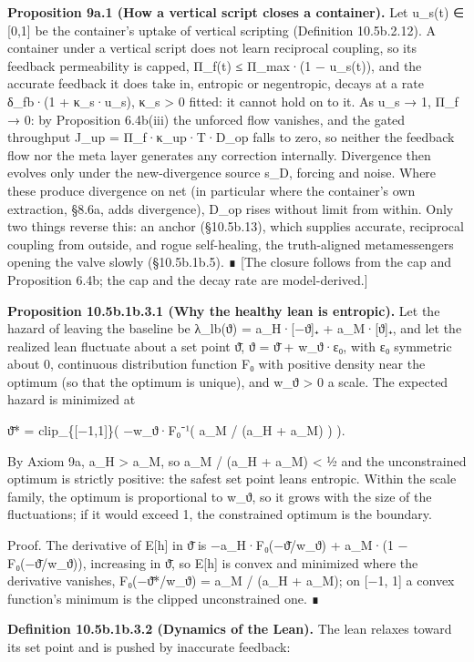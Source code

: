 \documentclass[
]{article}
\begin{document}
\textbf{Proposition 9a.1 (How a vertical script closes a container).}
Let u\_s(t) ∈ {[}0,1{]} be the container's uptake of vertical scripting
(Definition 10.5b.2.12). A container under a vertical script does not
learn reciprocal coupling, so its feedback permeability is capped,
Π\_f(t) ≤ Π\_max·(1 − u\_s(t)), and the accurate feedback it does take
in, entropic or negentropic, decays at a rate δ\_fb·(1 + κ\_s·u\_s),
κ\_s \textgreater{} 0 fitted: it cannot hold on to it. As u\_s → 1, Π\_f
→ 0: by Proposition 6.4b(iii) the unforced flow vanishes, and the gated
throughput J\_up = Π\_f·κ\_up·T·D\_op falls to zero, so neither the
feedback flow nor the meta layer generates any correction internally.
Divergence then evolves only under the new-divergence source s\_D,
forcing and noise. Where these produce divergence on net (in particular
where the container's own extraction, §8.6a, adds divergence), D\_op
rises without limit from within. Only two things reverse this: an anchor
(§10.5b.13), which supplies accurate, reciprocal coupling from outside,
and rogue self-healing, the truth-aligned metamessengers opening the
valve slowly (§10.5b.1b.5). ∎ {[}The closure follows from the cap and
Proposition 6.4b; the cap and the decay rate are model-derived.{]}

\textbf{Proposition 10.5b.1b.3.1 (Why the healthy lean is entropic).}
Let the hazard of leaving the baseline be λ\_lb(ϑ) = a\_H·{[}−ϑ{]}₊ +
a\_M·{[}ϑ{]}₊, and let the realized lean fluctuate about a set point ϑ̄,
ϑ = ϑ̄ + w\_ϑ·ε₀, with ε₀ symmetric about 0, continuous distribution
function F₀ with positive density near the optimum (so that the optimum
is unique), and w\_ϑ \textgreater{} 0 a scale. The expected hazard is
minimized at

ϑ̄* = clip\_\{{[}−1,1{]}\}( −w\_ϑ·F₀⁻¹( a\_M / (a\_H + a\_M) ) ).

By Axiom 9a, a\_H \textgreater{} a\_M, so a\_M / (a\_H + a\_M)
\textless{} ½ and the unconstrained optimum is strictly positive: the
safest set point leans entropic. Within the scale family, the optimum is
proportional to w\_ϑ, so it grows with the size of the fluctuations; if
it would exceed 1, the constrained optimum is the boundary.

Proof. The derivative of E{[}h{]} in ϑ̄ is −a\_H·F₀(−ϑ̄/w\_ϑ) + a\_M·(1 −
F₀(−ϑ̄/w\_ϑ)), increasing in ϑ̄, so E{[}h{]} is convex and minimized where
the derivative vanishes, F₀(−ϑ̄*/w\_ϑ) = a\_M / (a\_H + a\_M); on {[}−1,
1{]} a convex function's minimum is the clipped unconstrained one. ∎

\textbf{Definition 10.5b.1b.3.2 (Dynamics of the Lean).} The lean
relaxes toward its set point and is pushed by inaccurate feedback:
\end{document}
